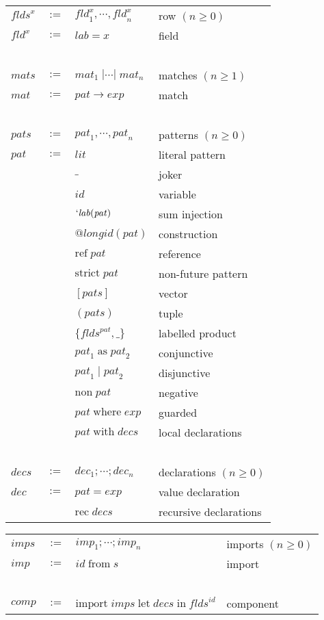 \documentclass[twoside]{article}
\newcommand{\x}[1]{\mathit{#1}}
\newcommand{\f}[1]{\mbox{#1}}
\newcommand{\lab}{\x{lab}}
\newcommand{\id}{\x{id}}
\newcommand{\longid}{\x{longid}}
\newcommand{\lit}{\x{lit}}
\renewcommand{\exp}{\x{exp}}
\newcommand{\fld}{\x{fld}}
\newcommand{\flds}{\x{flds}}
\newcommand{\mat}{\x{mat}}
\newcommand{\mats}{\x{mats}}
\newcommand{\pat}{\x{pat}}
\newcommand{\pats}{\x{pats}}
\newcommand{\dec}{\x{dec}}
\newcommand{\decs}{\x{decs}}
\newcommand{\imp}{\x{imp}}
\newcommand{\imps}{\x{imps}}
\newcommand{\comp}{\x{comp}}
\begin{document}
\begin{center}
\begin{tabular}{lcll}
$\flds^x$&$:=$&	$\fld^x_1,\cdots,\fld^x_n$	& row $(n\geq0)$ \\
$\fld^x$ &$:=$& $\lab = x$			& field \\
\ \\

$\mats$	&$:=$&	$\mat_1\;|\cdots|\;\mat_n$	& matches $(n\geq1)$ \\
$\mat$	&$:=$&	$\pat\to\exp$			& match \\
\ \\

$\pats$	&$:=$&	$\pat_1,\cdots,\pat_n$		& patterns $(n\geq0)$ \\
$\pat$	&$:=$&	$\lit$				& literal pattern \\
	&&	$\f{\_}$			& joker \\
	&&	$\id$				& variable \\
	&&	$`\lab(\pat)$			& sum injection \\
	&&	$@\longid(\pat)$		& construction \\
	&&	$\f{ref}\;\pat$			& reference \\
	&&	$\f{strict}\;\pat$		& non-future pattern \\
	&&	$[\pats]$			& vector \\
	&&	$(\pats)$			& tuple \\
	&&	$\{\flds^\pat,\_\}$		& labelled product \\
	&&	$\pat_1\;\f{as}\;\pat_2$	& conjunctive \\
	&&	$\pat_1\;|\;\pat_2$		& disjunctive \\
	&&	$\f{non}\;\pat$			& negative \\
	&&	$\pat\;\f{where}\;\exp$		& guarded \\
	&&	$\pat\;\f{with}\;\decs$		& local declarations \\
\ \\

$\decs$	&$:=$&	$\dec_1;\cdots;\dec_n$		& declarations $(n\geq0)$ \\
$\dec$	&$:=$&	$\pat = \exp$			& value declaration \\
	&&	$\f{rec}\;\decs$		& recursive declarations \\
\end{tabular}
\end{center}

\begin{center}
\begin{tabular}{lcll}

$\imps$	&$:=$&	$\imp_1;\cdots;\imp_n$		& imports $(n\geq0)$ \\
$\imp$	&$:=$&	$\id\;\f{from}\;s$		& import \\
\ \\

$\comp$	&$:=$&	$\f{import}\;\imps\;\f{let}\;\decs\;\f{in}\;\flds^\id$
						& component

\end{tabular}
\end{center}
\end{document}

